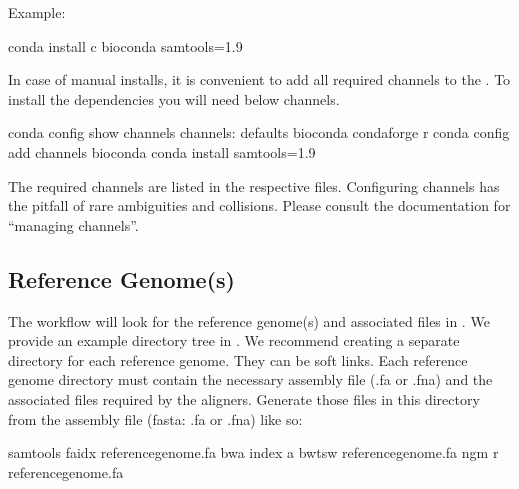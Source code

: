 \documentclass[letterpaper,10pt,english]{sphinxhowto}
\begin{document}
Example:

\begin{sphinxVerbatim}[commandchars=\\\{\}]
\PYGZdl{} conda install \PYGZhy{}c bioconda samtools=1.9
\end{sphinxVerbatim}

In case of manual installs, it is convenient to add all required channels to the . To install the dependencies you will need below channels.

\begin{sphinxVerbatim}[commandchars=\\\{\}]
\PYGZdl{} conda config \PYGZhy{}\PYGZhy{}show channels
channels:
      \PYGZhy{} defaults
      \PYGZhy{} bioconda
      \PYGZhy{} conda\PYGZhy{}forge
      \PYGZhy{} r
\PYGZdl{} conda config \PYGZhy{}\PYGZhy{}add channels bioconda
\PYGZdl{} conda install samtools=1.9
\end{sphinxVerbatim}

The required channels are listed in the respective  files. Configuring channels has the pitfall of rare ambiguities and collisions. Please consult the  documentation for “managing channels”.


\subsection{Reference Genome(s)}
\label{\detokenize{index:reference-genome-s}}
The workflow will look for the reference genome(s) and associated files in . We provide an example directory tree in . We recommend creating a separate directory for each reference genome. They can be soft links. Each reference genome directory must contain the necessary assembly file (.fa or .fna) and the associated files required by the aligners. Generate those files in this directory from the assembly file (fasta: .fa or .fna) like so:

\begin{sphinxVerbatim}[commandchars=\\\{\}]
\PYGZdl{} samtools faidx \PYGZlt{}reference\PYGZhy{}genome.fa\PYGZgt{}
\PYGZdl{} bwa index \PYGZhy{}a bwtsw \PYGZlt{}reference\PYGZhy{}genome.fa\PYGZgt{}
\PYGZdl{} ngm \PYGZhy{}r \PYGZlt{}reference\PYGZhy{}genome.fa\PYGZgt{}
\end{sphinxVerbatim}
\end{document}
